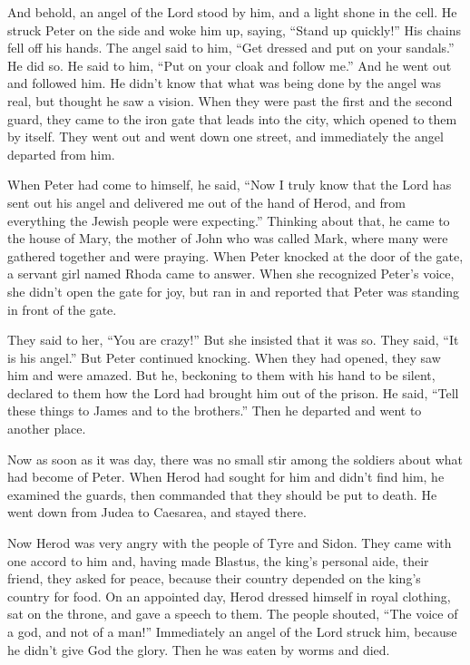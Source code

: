  And behold, an angel of the Lord stood by him, and a light
shone in the cell. He struck Peter on the side and woke him up, saying,
``Stand up quickly!'' His chains fell off his hands.  The
angel said to him, ``Get dressed and put on your sandals.'' He did so.
He said to him, ``Put on your cloak and follow me.''  And he
went out and followed him. He didn't know that what was being done by
the angel was real, but thought he saw a vision.  When they
were past the first and the second guard, they came to the iron gate
that leads into the city, which opened to them by itself. They went out
and went down one street, and immediately the angel departed from him.

 When Peter had come to himself, he said, ``Now I truly
know that the Lord has sent out his angel and delivered me out of the
hand of Herod, and from everything the Jewish people were expecting.''
 Thinking about that, he came to the house of Mary, the
mother of John who was called Mark, where many were gathered together
and were praying.  When Peter knocked at the door of the
gate, a servant girl named Rhoda came to answer.  When she
recognized Peter's voice, she didn't open the gate for joy, but ran in
and reported that Peter was standing in front of the gate.

 They said to her, ``You are crazy!'' But she insisted that
it was so. They said, ``It is his angel.''  But Peter
continued knocking. When they had opened, they saw him and were amazed.
 But he, beckoning to them with his hand to be silent,
declared to them how the Lord had brought him out of the prison. He
said, ``Tell these things to James and to the brothers.'' Then he
departed and went to another place.

 Now as soon as it was day, there was no small stir among
the soldiers about what had become of Peter.  When Herod
had sought for him and didn't find him, he examined the guards, then
commanded that they should be put to death. He went down from Judea to
Caesarea, and stayed there.

 Now Herod was very angry with the people of Tyre and
Sidon. They came with one accord to him and, having made Blastus, the
king's personal aide, their friend, they asked for peace, because their
country depended on the king's country for food.  On an
appointed day, Herod dressed himself in royal clothing, sat on the
throne, and gave a speech to them.  The people shouted,
``The voice of a god, and not of a man!''  Immediately an
angel of the Lord struck him, because he didn't give God the glory. Then
he was eaten by worms and died.

